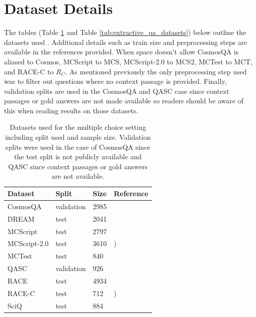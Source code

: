 \documentclass[11pt]{article}
\begin{document}
\section{Dataset Details}
\label{sec:appendix}
The tables (Table \ref{tab:mc_qa_datasets} and Table \ref{tab:extractive_qa_datasets}) below outline the datasets used . Additional details such as train size and preprocessing steps are available in the references provided. When space doesn't allow CosmosQA is aliased to Cosmos, MCScript to MCS, MCScript-2.0 to MCS2, MCTest to MCT, and RACE-C to $R_C$. As mentioned previously the only preprocessing step used was to filter out questions where no context passage is provided. Finally, validation splits are used in the CosmosQA and QASC case since context passages or gold answers are not made available so readers should be aware of this when reading results on those datasets.
\begin{table}[t!]
\centering
\begin{tabular}{llll}
\hline
Dataset & Split & Size & Reference \\ \hline
CosmosQA & validation & 2985 & \citet{huang_cosmos_2019} \\
DREAM & test & 2041 & \citet{sun_dream_2019} \\
MCScript & test & 2797 & \citet{ostermann_mcscript_2018} \\
MCScript-2.0 & test & 3610 & \citet{ostermann_mcscript20_2019}) \\
MCTest & test & 840 & \citet{richardson_mctest_2013} \\
QASC & validation & 926 & \citet{khot_qasc_2020} \\
RACE & test & 4934 & \citet{lai_race_2017} \\
RACE-C & test & 712 & \citet{liang_new_2019}) \\
SciQ & test & 884 & \citet{welbl_crowdsourcing_2017} \\ \hline
\end{tabular}
\caption{Datasets used for the multiple choice setting including split used and sample size. Validation splits were used in the case of CosmosQA since the test split is not publicly available and QASC since context passages or gold answers are not available.}
\label{tab:mc_qa_datasets}
\end{table}
\end{document}

